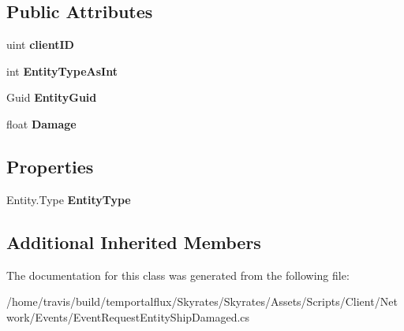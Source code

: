 \subsection*{Public Attributes}
\begin{DoxyCompactItemize}
\item 
\hypertarget{class_skyrates_1_1_client_1_1_network_1_1_event_1_1_event_request_entity_ship_damaged_ae096fc25a252dc81d9a721b3265bcf99}{uint {\bfseries client\-I\-D}}\label{class_skyrates_1_1_client_1_1_network_1_1_event_1_1_event_request_entity_ship_damaged_ae096fc25a252dc81d9a721b3265bcf99}

\item 
\hypertarget{class_skyrates_1_1_client_1_1_network_1_1_event_1_1_event_request_entity_ship_damaged_aa1ca6b110b90735e93238d21c3924ea5}{int {\bfseries Entity\-Type\-As\-Int}}\label{class_skyrates_1_1_client_1_1_network_1_1_event_1_1_event_request_entity_ship_damaged_aa1ca6b110b90735e93238d21c3924ea5}

\item 
\hypertarget{class_skyrates_1_1_client_1_1_network_1_1_event_1_1_event_request_entity_ship_damaged_ab19fe3a4a86aa9230fe9c15128372428}{Guid {\bfseries Entity\-Guid}}\label{class_skyrates_1_1_client_1_1_network_1_1_event_1_1_event_request_entity_ship_damaged_ab19fe3a4a86aa9230fe9c15128372428}

\item 
\hypertarget{class_skyrates_1_1_client_1_1_network_1_1_event_1_1_event_request_entity_ship_damaged_ab3f8cd68107133271b5d5280c351060e}{float {\bfseries Damage}}\label{class_skyrates_1_1_client_1_1_network_1_1_event_1_1_event_request_entity_ship_damaged_ab3f8cd68107133271b5d5280c351060e}

\end{DoxyCompactItemize}
\subsection*{Properties}
\begin{DoxyCompactItemize}
\item 
\hypertarget{class_skyrates_1_1_client_1_1_network_1_1_event_1_1_event_request_entity_ship_damaged_a165cacb63507cfc6704131304eb17632}{Entity.\-Type {\bfseries Entity\-Type}}\label{class_skyrates_1_1_client_1_1_network_1_1_event_1_1_event_request_entity_ship_damaged_a165cacb63507cfc6704131304eb17632}

\end{DoxyCompactItemize}
\subsection*{Additional Inherited Members}


The documentation for this class was generated from the following file\-:\begin{DoxyCompactItemize}
\item 
/home/travis/build/temportalflux/\-Skyrates/\-Skyrates/\-Assets/\-Scripts/\-Client/\-Network/\-Events/Event\-Request\-Entity\-Ship\-Damaged.\-cs\end{DoxyCompactItemize}
